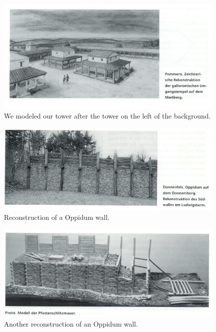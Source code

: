 \begin{figure}[ht]
	\centering
	\includegraphics[width=\linewidth]{pictures/scan_rieckhoff_tower.png}
	\caption{We modeled our tower after the tower on the left of the background.}
\end{figure}

\begin{figure}[ht]
	\centering
	\includegraphics[width=\linewidth]{pictures/scan_rieckhoff_wall1.png}
	\caption{Reconstruction of a Oppidum wall.}
\end{figure}

\begin{figure}[ht]
	\centering
	\includegraphics[width=\linewidth]{pictures/scan_rieckhoff_wall2.png}
	\caption{Another reconstruction of an Oppidum wall.}
\end{figure}

